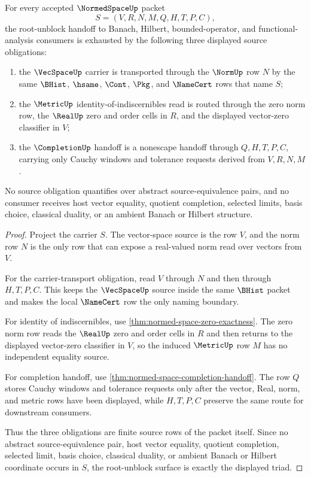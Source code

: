 \begin{theorem}
\label{thm:normed-space-root-unblock-source-triad}
For every accepted $\NormedSpaceUp$ packet
$$
S=(V,R,N,M,Q,H,T,P,C),
$$
the root-unblock handoff to Banach, Hilbert, bounded-operator, and functional-analysis consumers is exhausted by the following three displayed source obligations:
\begin{enumerate}
\item the $\VecSpaceUp$ carrier is transported through the $\NormUp$ row $N$ by the same $\BHist$, $\hsame$, $\Cont$, $\Pkg$, and $\NameCert$ rows that name $S$;
\item the $\MetricUp$ identity-of-indiscernibles read is routed through the zero norm row, the $\RealUp$ zero and order cells in $R$, and the displayed vector-zero classifier in $V$;
\item the $\CompletionUp$ handoff is a nonescape handoff through $Q,H,T,P,C$, carrying only Cauchy windows and tolerance requests derived from $V,R,N,M$.
\end{enumerate}
No source obligation quantifies over abstract source-equivalence pairs, and no consumer receives host vector equality, quotient completion, selected limits, basis choice, classical duality, or an ambient Banach or Hilbert structure.
\end{theorem}
\begin{proof}
Project the carrier $S$. The vector-space source is the row $V$, and the norm row $N$ is the only row that can expose a real-valued norm read over vectors from $V$.

For the carrier-transport obligation, read $V$ through $N$ and then through $H,T,P,C$. This keeps the $\VecSpaceUp$ source inside the same $\BHist$ packet and makes the local $\NameCert$ row the only naming boundary.

For identity of indiscernibles, use \autoref{thm:normed-space-zero-exactness}. The zero norm row reads the $\RealUp$ zero and order cells in $R$ and then returns to the displayed vector-zero classifier in $V$, so the induced $\MetricUp$ row $M$ has no independent equality source.

For completion handoff, use \autoref{thm:normed-space-completion-handoff}. The row $Q$ stores Cauchy windows and tolerance requests only after the vector, Real, norm, and metric rows have been displayed, while $H,T,P,C$ preserve the same route for downstream consumers.

Thus the three obligations are finite source rows of the packet itself. Since no abstract source-equivalence pair, host vector equality, quotient completion, selected limit, basis choice, classical duality, or ambient Banach or Hilbert coordinate occurs in $S$, the root-unblock surface is exactly the displayed triad.
\end{proof}

